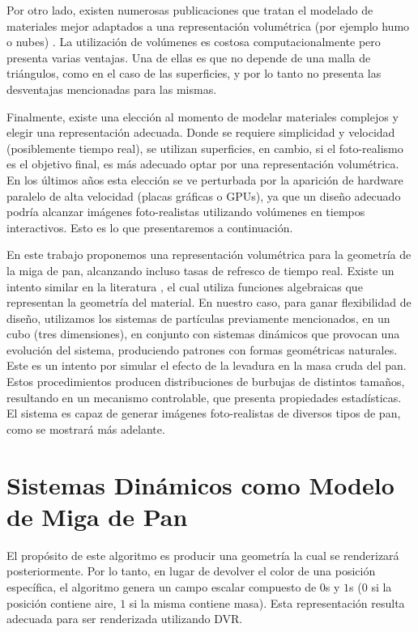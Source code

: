 \documentclass[spanish,a4paper,openright,11pt]{book}
\begin{document}
Por otro lado, existen numerosas publicaciones que tratan el modelado de materiales mejor adaptados a una representación volumétrica (por ejemplo humo o nubes) \cite{Chentanez2011,Zhou2008}.
La utilización de volúmenes es costosa computacionalmente pero presenta varias ventajas. Una de ellas es que no depende de una malla de triángulos, como en el caso de las superficies, y por lo tanto no presenta las desventajas mencionadas para las mismas.

Finalmente, existe una elección al momento de modelar materiales complejos y elegir una representación adecuada.
Donde se requiere simplicidad y velocidad (posiblemente tiempo real), se utilizan superficies, en cambio, si el foto-realismo es el objetivo final, es más adecuado optar por una representación volumétrica.
En los últimos años esta elección se ve perturbada por la aparición de hardware paralelo de alta velocidad (placas gráficas o GPUs), ya que un diseño adecuado podría alcanzar imágenes foto-realistas utilizando volúmenes en tiempos interactivos.
Esto es lo que presentaremos a continuación.


En este trabajo proponemos una representación volumétrica para la geometría de la miga de pan, alcanzando incluso tasas de refresco de tiempo real.
Existe un intento similar en la literatura \cite{Perlin1989}, el cual utiliza funciones algebraicas que representan la geometría del material.
En nuestro caso, para ganar flexibilidad de diseño, utilizamos los sistemas de partículas previamente mencionados, en un cubo (tres dimensiones), en conjunto con sistemas dinámicos \cite{Strogatz2001} que provocan una evolución del sistema, produciendo patrones con formas geométricas naturales.
Este es un intento por simular el efecto de la levadura en la masa cruda del pan.
Estos procedimientos producen distribuciones de burbujas de distintos tamaños, resultando en un mecanismo controlable, que presenta propiedades estadísticas.
El sistema es capaz de generar imágenes foto-realistas de diversos tipos de pan, como se mostrará más adelante.

\section{Sistemas Dinámicos como Modelo de Miga de Pan}
El prop\'osito de este algoritmo es producir una geometr\'ia la cual se renderizar\'a posteriormente. Por lo tanto, en lugar de devolver el color de una posici\'on espec\'ifica, el algoritmo genera un campo escalar compuesto de $0$s y $1$s ($0$ si la posici\'on contiene aire, $1$ si la misma contiene masa).
Esta representaci\'on resulta adecuada para ser renderizada utilizando DVR.
\end{document}
